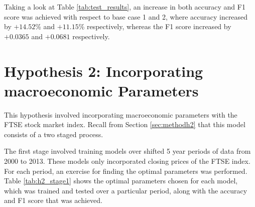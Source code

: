 \documentclass{UoYCSproject}
\begin{document}
Taking a look at Table \ref{tab:test_results}, an increase in both accuracy and F1 score was achieved with respect to base case 1 and 2, where accuracy increased by $+14.52$\% and $+11.15$\% respectively, whereas the F1 score increased by $+0.0365$ and $+0.0681$ respectively.

\section{Hypothesis 2: Incorporating macroeconomic Parameters}
This hypothesis involved incorporating macroeconomic parameters with the FTSE stock market index. Recall from Section \ref{sec:methodh2} that this model consists of a two staged process.

The first stage involved training models over shifted 5 year periods of data from 2000 to 2013. These models only incorporated closing prices of the FTSE index. For each period, an exercise for finding the optimal parameters was performed. Table \ref{tab:h2_stage1} shows the optimal parameters chosen for each model, which was trained and tested over a particular period, along with the accuracy and F1 score that was achieved. 
\end{document}
